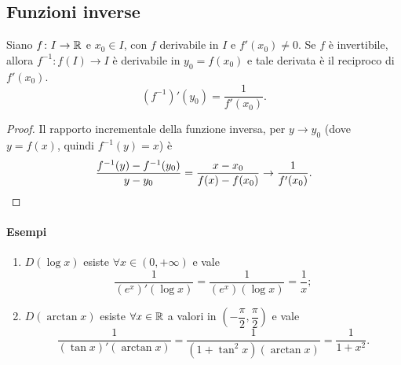 \subsection{Funzioni inverse}
\begin{teorema}
Siano $f\colon I\to\mathbb{R}$ e $x_0\in I$, con $f$ derivabile in $I$ e $f'(x_0)\neq 0$. Se $f$ è invertibile, allora $f^{-1}\colon f(I)\to I$ è derivabile in $y_0=f(x_0)$ e tale derivata è il reciproco di $f'(x_0)$.
\begin{equation}
(f^{-1})'(y_0)=\frac1{f'(x_0)}.
\end{equation}
\end{teorema}
\begin{proof}
Il rapporto incrementale della funzione inversa, per $y\to y_0$ (dove $y=f(x)$, quindi $f^{-1}(y)=x$) è
\[
\frac{f^{-1}(y)-f^{-1}(y_0)}{y-y_0}=\frac{x-x_0}{f(x)-f(x_0)}\to\frac1{f'(x_0)}.\qedhere
\]
\end{proof}
\paragraph{Esempi}
\begin{enumerate}
\item $D(\log x)$ esiste $\forall x\in (0,+\infty)$ e vale
\[
\frac1{(e^x)'(\log x)}=\frac1{(e^x)(\log x)}=\frac1{x};
\]
\item $D(\arctan x)$ esiste $\forall x\in\mathbb{R}$ a valori in $\left(-\dfrac{\pi}2,\dfrac{\pi}2\right)$ e vale
\[
\frac1{(\tan x)'(\arctan x)}=\frac1{(1+\tan^2x)(\arctan x)}=\frac1{1+x^2}.
\]
\end{enumerate}
